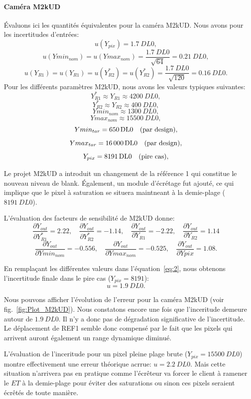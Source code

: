 \documentclass[11pt]{report}
\newcommand{\pd}[2]{\frac{\partial{#1}}{\partial{#2}}}
\newcommand{\sfone}{\pd{Y_{out}}{Y_{R1}^*}}
\newcommand{\sftwo}{\pd{Y_{out}}{Y_{R2}^*}}
\newcommand{\sfthree}{\pd{Y_{out}}{Y_{R1}}}
\newcommand{\sffour}{\pd{Y_{out}}{Y_{R2}}}
\newcommand{\sffive}{\pd{Y_{out}}{Ymin_{nom}}}
\newcommand{\sfsix}{\pd{Y_{out}}{Ymax_{nom}}}
\newcommand{\sfseven}{\pd{Y_{out}}{Y{pix}}}
\newcommand{\errqty}[1]{\qty{#1}{\unit{DL0}}}
\begin{document}
\paragraph{Caméra M2kUD}
Évaluons ici les quantités équivalentes pour la caméra M2kUD. Nous avons pour les incertitudes d'entrées:
\[u(Y_{pix})=\errqty{1.7},\]
\[u(Ymin_{nom})=u(Ymax_{nom})=\frac{\errqty{1.7}}{\sqrt{64}}=\errqty{0.21},\]
\[u(Y_{R1})=u(Y_{R1})=u(Y_{R2}^*)=u(Y_{R2}^*)=\frac{\errqty{1.7}}{\sqrt{120}}=\errqty{0.16}.\]
Pour les différents paramètres M2kUD, nous avons les valeurs typiques suivantes:
\[Y_{R1}^*\approx{}Y_{R1}\approx\errqty{4200},\]
\[Y_{R2}^*\approx{}Y_{R2}\approx\errqty{400},\]
\[Ymin_{nom}\approx\errqty{1300},\]
\[Ymax_{nom}\approx\errqty{15500},\]
\[Ymin_{tar}=\errqty{650}\text{\quad(par design)},\]
\[Ymax_{tar}=\errqty{16000}\text{\quad(par design)},\]
\[Y_{pix}=\errqty{8191}\text{\quad(pire cas)},\]

Le projet M2kUD a introduit un changement de la référence 1 qui constitue le nouveau niveau de blank. Également, un module d'écrétage fut ajouté, ce qui implique que le pixel à saturation se situera maintneant à la demie-plage ($\errqty{8191}$).

L'évaluation des facteurs de sensibilité de M2kUD donne:
\[\sfone=2.22,\quad\sftwo=-1.14,\quad\sfthree=-2.22,\quad\sffour=1.14\]
\[\sffive=\num{-0.556},\quad\sfsix=-0.525,\quad\sfseven=1.08.\]

En remplaçant les différentes valeurs dans l'équation~\eqref{eq:2}, nous obtenons l'incertitude finale dans le pire cas ($Y_{pix}=8191$): 
\[u=\errqty{1.9}.\]

Nous pouvons afficher l'évolution de l'erreur pour la caméra M2kUD (voir fig.~\ref{fig:Plot_M2kUD}). Nous constatons encore une fois que l'inceritude demeure autour de $\errqty{1.9}$. Il n'y a donc pas de dégradation significative de l'incertitude. Le déplacement de REF1 semble donc compensé par le fait que les pixels qui arrivent auront également un range dynamique diminué. 

L'évaluation de l'inceritude pour un pixel pleine plage brute ($Y_{pix}=\errqty{15500}$) montre effectivement une erreur théorique acrrue: $u=\errqty{2.2}$. Mais cette situation n'arrivera pas en pratique comme l'écrêteur va forcer le client à ramener le $ET$ à la demie-plage pour éviter des saturations ou sinon ces pixels seraient écrêtés de toute manière.
\end{document}
